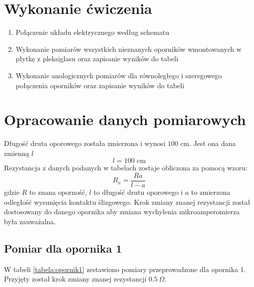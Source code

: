 \documentclass[a4paper,12pts]{article}
\begin{document}


	\section{Wykonanie ćwiczenia}
	
	\begin{enumerate}
		\item Połączenie układu elektrycznego według schematu
		\item Wykonanie pomiarów wszystkich nieznanych oporników wmontowanych w płytkę z pleksiglasu oraz zapisanie wyników do tabeli
		\item Wykonanie anologicznych pomiarów dla równoległego i szeregowego połączenia oporników oraz zapisanie wyników do tabeli
	\end{enumerate}

	
	\section{Opracowanie danych pomiarowych}
Długość druta oporowego została zmierzona i wynosi $100$ cm. Jest ona dana zmienną $l$
\begin{equation}
l = 100 \textrm{ cm}
\end{equation}
Rezystancja z danych podanych w tabelach zostaje obliczona za pomocą wzoru:
\begin{equation}
R_x = \frac{Ra}{l-a}
\end{equation}
gdzie $R$ to znana oporność, $l$ to długość drutu oporowego i $a$ to zmierzona odległość wysunięcia kontaktu ślizgowego. Krok zmiany znanej rezystancji został dostosowany do danego opornika aby zmiana wychylenia mikroamperomierza była zauważalna.

\subsection{Pomiar dla opornika 1}
W tabeli \ref{tabela:opornik1} zestawiono pomiary przeprowadzone dla opornika 1. Przyjęty został krok zmiany znanej rezystancji $0.5 ~\Omega$.

\begin{table}[!h]
	\centering
	\caption{Wyniki pomiarów dla opornika nr 1}
	\label{tabela:opornik1}
\end{table}
\end{document}
